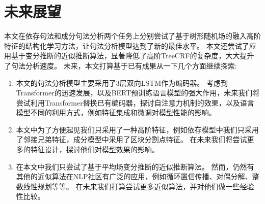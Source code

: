 \section{未来展望}
本文在依存句法和成分句法分析两个任务上分别尝试了基于树形随机场的融入高阶特征的结构化学习方法，让句法分析模型达到了新的最佳水平。
本文还尝试了应用基于变分推断的近似推断算法，显著降低了高阶TreeCRF的复杂度，大大提升了句法分析速度。
未来，本文打算基于已有成果从一下几个方面继续探索:
\begin{enumerate}
	\item 本文的句法分析模型主要采用了3层双向LSTM作为编码器。
	      考虑到Transformer的迅速发展，以及BERT预训练语言模型的强大作用，未来我们将尝试利用Transformer替换已有编码器，探讨自注意力机制的效果，以及语言模型不同的利用方式，例如特征集成和微调对模型性能的影响。
	\item 本文中为了方便起见我们只采用了一种高阶特征，例如依存模型中我们只采用了邻接兄弟特征，成分模型中采用了区块分割点特征。
	      在未来我们将尝试更多的特征设计，探讨他们对模型效果的影响。
	\item 在本文中我们只尝试了基于平均场变分推断的近似推断算法。
	      然而，仍然有其他的近似算法在NLP社区有广泛的应用，例如循环置信传播、对偶分解、整数线性规划等等。
	      在未来我们打算尝试更多近似算法，并对他们做一些经验性比较。
\end{enumerate}